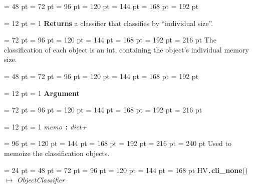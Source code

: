 {{{{\par \noindent  \leftskip = 48 pt  \leftmargini = 72 pt  \leftmarginii = 96 pt  \leftmarginiii = 120 pt  \leftmarginiv = 144 pt  \leftmarginv = 168 pt  \leftmarginvi = 192 pt {\par \noindent
{\par \pagebreak[3.100000] \noindent \hangindent = 12 pt \hangafter = 1 
{\bf Returns \/} a classifier that classifies by ``individual size''.\par}
{\par \noindent  \leftskip = 72 pt  \leftmargini = 96 pt  \leftmarginii = 120 pt  \leftmarginiii = 144 pt  \leftmarginiv = 168 pt  \leftmarginv = 192 pt  \leftmarginvi = 216 pt  The classification of each object is an int, containing the
object's individual memory size.\par}
\par}
\par}
{\par \noindent  \leftskip = 48 pt  \leftmargini = 72 pt  \leftmarginii = 96 pt  \leftmarginiii = 120 pt  \leftmarginiv = 144 pt  \leftmarginv = 168 pt  \leftmarginvi = 192 pt {\par \noindent
{\par \pagebreak[3.100000] \noindent \hangindent = 12 pt \hangafter = 1 
{\bf Argument\/}\par}
{\par \noindent  \leftskip = 72 pt  \leftmargini = 96 pt  \leftmarginii = 120 pt  \leftmarginiii = 144 pt  \leftmarginiv = 168 pt  \leftmarginv = 192 pt  \leftmarginvi = 216 pt {\par \noindent
{\par \pagebreak[3.000000] \noindent \hangindent = 12 pt \hangafter = 1 
{\em memo\/}~{\bf :}  {\em dict+\/}\par}
{\par \noindent  \leftskip = 96 pt  \leftmargini = 120 pt  \leftmarginii = 144 pt  \leftmarginiii = 168 pt  \leftmarginiv = 192 pt  \leftmarginv = 216 pt  \leftmarginvi = 240 pt  Used to memoize the classification objects.
\par}
\par}
\par}
\par}
\par}
\par}
\par}
{\par \noindent  \leftskip = 24 pt  \leftmargini = 48 pt  \leftmarginii = 72 pt  \leftmarginiii = 96 pt  \leftmarginiv = 120 pt  \leftmarginv = 144 pt  \leftmarginvi = 168 pt HV{\tt .\/}{\bf {\large {\bf cli{\_}none\/}}\/}() \(\mapsto \)  {\em ObjectClassifier\/}{\par \noindent
}}}
